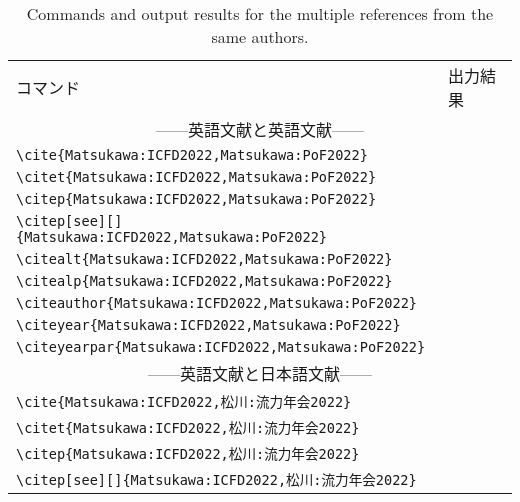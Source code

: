 \documentclass[a4paper,fleqn,uplatex,dvipdfmx]{jsarticle}
\begin{document}
\begin{table}[t]
    \centering
    \caption{Commands and output results for the multiple references from the same authors.}
    \label{tab:same_authors}
    \begin{tabular}{ll}
        コマンド &出力結果 \\
        \multicolumn{2}{c}{------英語文献と英語文献------} \\
        \verb|\cite{Matsukawa:ICFD2022,Matsukawa:PoF2022}|            &\cite{Matsukawa:ICFD2022,Matsukawa:PoF2022} \\
        \verb|\citet{Matsukawa:ICFD2022,Matsukawa:PoF2022}|           &\citet{Matsukawa:ICFD2022,Matsukawa:PoF2022} \\
        \verb|\citep{Matsukawa:ICFD2022,Matsukawa:PoF2022}|           &\citep{Matsukawa:ICFD2022,Matsukawa:PoF2022} \\
        \verb|\citep[see][]{Matsukawa:ICFD2022,Matsukawa:PoF2022}|           &\citep[see][]{Matsukawa:ICFD2022,Matsukawa:PoF2022} \\
        \verb|\citealt{Matsukawa:ICFD2022,Matsukawa:PoF2022}|         &\citealt{Matsukawa:ICFD2022,Matsukawa:PoF2022} \\
        \verb|\citealp{Matsukawa:ICFD2022,Matsukawa:PoF2022}|         &\citealp{Matsukawa:ICFD2022,Matsukawa:PoF2022} \\
        \verb|\citeauthor{Matsukawa:ICFD2022,Matsukawa:PoF2022}|      &\citeauthor{Matsukawa:ICFD2022,Matsukawa:PoF2022} \\
        \verb|\citeyear{Matsukawa:ICFD2022,Matsukawa:PoF2022}|        &\citeyear{Matsukawa:ICFD2022,Matsukawa:PoF2022} \\
        \verb|\citeyearpar{Matsukawa:ICFD2022,Matsukawa:PoF2022}|     &\citeyearpar{Matsukawa:ICFD2022,Matsukawa:PoF2022} \\
        \multicolumn{2}{c}{------英語文献と日本語文献------} \\
        \verb|\cite{Matsukawa:ICFD2022,松川:流力年会2022}|            &\cite{Matsukawa:ICFD2022,松川:流力年会2022} \\
        \verb|\citet{Matsukawa:ICFD2022,松川:流力年会2022}|           &\citet{Matsukawa:ICFD2022,松川:流力年会2022} \\
        \verb|\citep{Matsukawa:ICFD2022,松川:流力年会2022}|           &\citep{Matsukawa:ICFD2022,松川:流力年会2022} \\
        \verb|\citep[see][]{Matsukawa:ICFD2022,松川:流力年会2022}|           &\citep[see][]{Matsukawa:ICFD2022,松川:流力年会2022} \\

\end{tabular}
\end{table}
\end{document}
